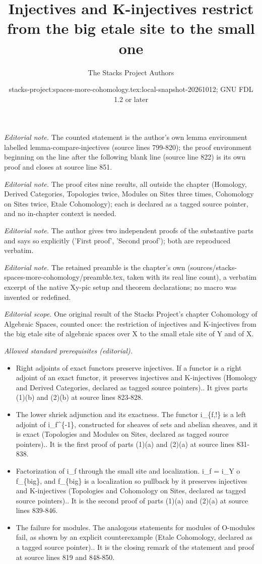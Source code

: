 \documentclass{stacks-project}
\title{Injectives and K-injectives restrict from the big etale site to the small one}
\author{The Stacks Project Authors}
\date{stacks-project:spaces-more-cohomology.tex:local-snapshot-20261012; GNU FDL 1.2 or later}
\theoremstyle{plain}
\theoremstyle{definition}
\theoremstyle{remark}
\numberwithin{equation}{subsection}
\begin{document}
\maketitle
\noindent\textit{Editorial note.} The counted statement is the author's own lemma environment labelled lemma-compare-injectives (source lines 799-820); the proof environment beginning on the line after the following blank line (source line 822) is its own proof and closes at source line 851.\par\medskip
\noindent\textit{Editorial note.} The proof cites nine results, all outside the chapter (Homology, Derived Categories, Topologies twice, Modules on Sites three times, Cohomology on Sites twice, Etale Cohomology); each is declared as a tagged source pointer, and no in-chapter context is needed.\par\medskip
\noindent\textit{Editorial note.} The author gives two independent proofs of the substantive parts and says so explicitly ('First proof', 'Second proof'); both are reproduced verbatim.\par\medskip
\noindent\textit{Editorial note.} The retained preamble is the chapter's own (sources/stacks-spaces-more-cohomology/preamble.tex, taken with its real line count), a verbatim excerpt of the native Xy-pic setup and theorem declarations; no macro was invented or redefined.\par\medskip
\noindent\textit{Editorial scope.} One original result of the Stacks Project's chapter Cohomology of Algebraic Spaces, counted once: the restriction of injectives and K-injectives from the big etale site of algebraic spaces over X to the small etale site of Y and of X.\par\medskip
\noindent\textit{Allowed standard prerequisites (editorial).}\begin{itemize}
\item Right adjoints of exact functors preserve injectives. If a functor is a right adjoint of an exact functor, it preserves injectives and K-injectives (Homology and Derived Categories, declared as tagged source pointers).. It gives parts (1)(b) and (2)(b) at source lines 823-828.
\item The lower shriek adjunction and its exactness. The functor i\_\{f,!\} is a left adjoint of i\_f\textasciicircum{}\{-1\}, constructed for sheaves of sets and abelian sheaves, and it is exact (Topologies and Modules on Sites, declared as tagged source pointers).. It is the first proof of parts (1)(a) and (2)(a) at source lines 831-838.
\item Factorization of i\_f through the small site and localization. i\_f = i\_Y o f\_\{big\}, and f\_\{big\} is a localization so pullback by it preserves injectives and K-injectives (Topologies and Cohomology on Sites, declared as tagged source pointers).. It is the second proof of parts (1)(a) and (2)(a) at source lines 839-846.
\item The failure for modules. The analogous statements for modules of O-modules fail, as shown by an explicit counterexample (Etale Cohomology, declared as a tagged source pointer).. It is the closing remark of the statement and proof at source lines 819 and 848-850.
\end{itemize}\medskip
\end{document}
